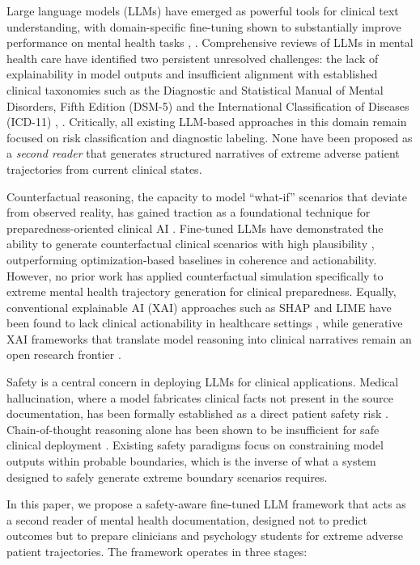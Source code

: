\documentclass[conference]{IEEEtran}
\begin{document}
Large language models (LLMs) have emerged as powerful tools for clinical text understanding, with domain-specific fine-tuning shown to substantially improve performance on mental health tasks \cite{b4}, \cite{b5}. Comprehensive reviews of LLMs in mental health care have identified two persistent unresolved challenges: the lack of explainability in model outputs and insufficient alignment with established clinical taxonomies such as the Diagnostic and Statistical Manual of Mental Disorders, Fifth Edition (DSM-5) and the International Classification of Diseases (ICD-11) \cite{b6}, \cite{b7}. Critically, all existing LLM-based approaches in this domain remain focused on risk classification and diagnostic labeling. None have been proposed as a \textit{second reader} that generates structured narratives of extreme adverse patient trajectories from current clinical states.

Counterfactual reasoning, the capacity to model ``what-if'' scenarios that deviate from observed reality, has gained traction as a foundational technique for preparedness-oriented clinical AI \cite{b8}. Fine-tuned LLMs have demonstrated the ability to generate counterfactual clinical scenarios with high plausibility \cite{b9}, outperforming optimization-based baselines in coherence and actionability. However, no prior work has applied counterfactual simulation specifically to extreme mental health trajectory generation for clinical preparedness. Equally, conventional explainable AI (XAI) approaches such as SHAP and LIME have been found to lack clinical actionability in healthcare settings \cite{b10}, while generative XAI frameworks that translate model reasoning into clinical narratives remain an open research frontier \cite{b11}.

Safety is a central concern in deploying LLMs for clinical applications. Medical hallucination, where a model fabricates clinical facts not present in the source documentation, has been formally established as a direct patient safety risk \cite{b12}. Chain-of-thought reasoning alone has been shown to be insufficient for safe clinical deployment \cite{b13}. Existing safety paradigms focus on constraining model outputs within probable boundaries, which is the inverse of what a system designed to safely generate extreme boundary scenarios requires.

In this paper, we propose a safety-aware fine-tuned LLM framework that acts as a second reader of mental health documentation, designed not to predict outcomes but to prepare clinicians and psychology students for extreme adverse patient trajectories. The framework operates in three stages:
\end{document}
